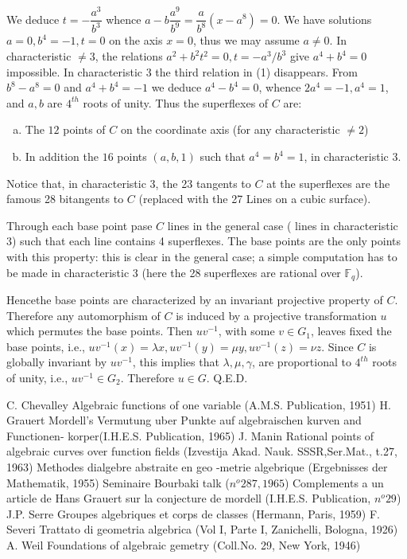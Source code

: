 We deduce $t = -\dfrac{a^3}{b^3} $ whence $a-b \dfrac{a^9}{b^9}=
\dfrac{a}{b^8}(x-a^8) = 0$. 
We have solutions $a = 0 , b^4 = -1, t = 0$ on the axis $x = 0$, thus
we may assume $a \neq 0$. In characteristic $\neq 3$, the relations
$a^2 + b^2 t^2 = 0 , t = -a^3/b^3$ give $a^4 + b^4 = 0$ impossible. In
characteristic 3 the third relation  in (1) 
disappears. From $b^8 -a^8 = 0$ and $a^4 + b^4 =-1$ we deduce $a^4-
b^4 = 0$, whence $2a^4 = -1, a^4 = 1$, and $a,b$ are $4^{th}$ roots of
unity. Thus the superflexes of $C$ are:  
\begin{enumerate}[a)]
\item The $12$ points of $C$ on the coordinate axis (for any
  characteristic $\neq 2$) 
\item In  addition the $16$ points $(a,b,1)$ such that $a^4 = b^4 =
  1$, in characteristic $3$. 
\end{enumerate}

Notice that, in characteristic 3, the 23 tangents to $C$ at the
superflexes are the famous 28  
bitangents to $C$ (replaced with the 27 Lines on a cubic surface).

Through each base point pase $C$ lines in the general case (
lines in characteristic 3) such that each line contains 4
superflexes. The base points are the only points with this property:
this is clear in the general case; a simple computation has to be made
in characteristic 3 (here the 28 superflexes are rational over
$\mathbb{F}_q$). 

Hence\pageoriginale the base points are characterized by an invariant projective
property of $C$. Therefore any automorphism of $C$ is induced by a
projective transformation $u$ which permutes the base points. Then
$uv^{-1}$, with some $v \in G_1$, leaves fixed the base points, i.e.,  
$uv^{-1}(x) = \lambda x, uv^{-1}(y)= \mu y, uv^{-1}(z) = \nu z$. Since
$C$ is globally invariant by $uv^{-1}$, this implies that $\lambda,
\mu, \gamma$, are proportional to $4^{th}$ roots of unity, i.e., $uv^{-1}\in
G_2$. Therefore $u \in G$. \hfill Q.E.D.

\begin{thebibliography}{99}
  {C. Chevalley}  Algebraic functions of one variable
  (A.M.S. Publication, 1951)
 {H. Grauert} Mordell's Vermutung uber Punkte auf
  algebraischen kurven and Functionen-
  korper(I.H.E.S. Publication, 1965)
 {J. Manin}  Rational points of algebraic curves
  over function fields (Izvestija Akad.
  Nauk. SSSR,Ser.Mat., t.27, 1963)
  Methodes dialgebre abstraite en geo
  -metrie algebrique (Ergebnisses der
  Mathematik, 1955)
 {Seminaire Bourbaki talk} ($n^o 287, 1965$)
  Complements a un article de Hans
  Grauert sur la conjecture de mordell
  (I.H.E.S. Publication, $n^o 29$)
 {J.P. Serre}  Groupes algebriques et corps de classes
  (Hermann, Paris, 1959)
 {F. Severi}  Trattato di geometria algebrica (Vol I,
  Parte I, Zanichelli, Bologna, 1926)
 {A. Weil}  Foundations of algebraic gemetry
  (Coll.No. 29, New York, 1946)
\end{thebibliography}

